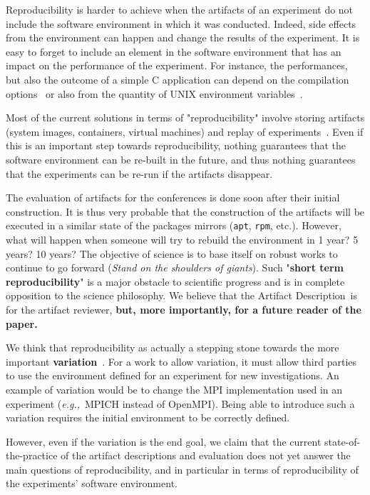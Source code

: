 \documentclass[sigconf,natbib=false]{acmart}
\newcommand{\repro}{reproducibility}
\newcommand{\eg}{\emph{e.g.,}}
\newcommand{\ad}{Artifact Description}
\begin{document}
Reproducibility is harder to achieve when the artifacts of an experiment do not include the software environment in which it was conducted.
Indeed, side effects from the environment can happen and change the results of the experiment.
It is easy to forget to include an element in the software environment that has an impact on the performance of the experiment.
For instance, the performances, but also the outcome of a simple C application can depend on the compilation options\ \cite{stodden2018assessing} or also from the quantity of UNIX environment variables\ \cite{mytkowicz2009producing}.

Most of the current solutions in terms of "\repro" involve storing artifacts (system images, containers, virtual machines) and replay of experiments\ \cite{rosendo2020e2clab, brammer2011paper, brinckman2019computing}.
Even if this is an important step towards \repro, nothing guarantees that the software environment can be re-built in the future, and thus nothing guarantees that the experiments can be re-run if the artifacts disappear. 


The evaluation of artifacts for the conferences is done soon after their initial construction.
It is thus very probable that the construction of the artifacts will be executed in a similar state of the packages mirrors (\texttt{apt}, \texttt{rpm}, etc.).
However, what will happen when someone will try to rebuild the environment in 1 year? 5 years? 10 years?
The objective of science is to base itself on robust works to continue to go forward (\emph{Stand on the shoulders of giants}).
Such "\textbf{short term reproducibility}" is a major obstacle to scientific progress and is in complete opposition to the science philosophy.
We believe that the \ad\ is for the artifact reviewer, \textbf{but, more importantly, for a future reader of the paper.}


We think that reproducibility as actually a stepping stone towards the more important \textbf{variation}\ \cite{mercier2018considering, feitelson_repeatability_2015}.
For a work to allow variation, it must allow third parties to use the environment defined for an experiment for new investigations.
An example of variation would be to change the MPI implementation used in an experiment (\eg\ MPICH instead of OpenMPI).
Being able to introduce such a variation requires the initial environment to be correctly defined.

However, even if the variation is the end goal, we claim that the current state-of-the-practice of the artifact descriptions and evaluation does not yet answer the main questions of reproducibility, and in particular in terms of reproducibility of the experiments' software environment.
\end{document}

